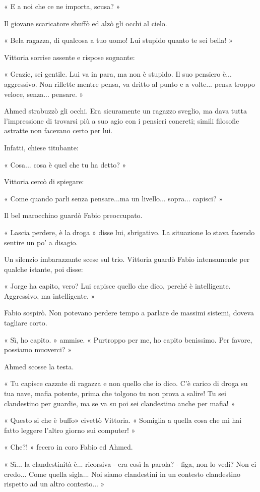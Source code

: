 « E a noi che ce ne importa, scusa? »

Il giovane scaricatore sbuffò ed alzò gli occhi al cielo.

« Bela ragazza, di qualcosa a tuo uomo! Lui stupido quanto te sei bella! »

Vittoria sorrise assente e rispose sognante:

« Grazie, sei gentile. Lui va in para, ma non è stupido. Il suo pensiero è... aggressivo. Non riflette mentre pensa, va dritto al punto e a volte... pensa troppo veloce, senza... pensare. »

Ahmed strabuzzò gli occhi. Era sicuramente un ragazzo sveglio, ma dava tutta l'impressione di trovarsi più a suo agio con i pensieri concreti; simili filosofie astratte non facevano certo per lui.

Infatti, chiese titubante:

« Cosa... cosa è quel che tu ha detto? »

Vittoria cercò di spiegare:

« Come quando parli senza pensare...ma un livello... sopra... capisci? »

Il bel marocchino guardò Fabio preoccupato.

« Lascia perdere, è la droga » disse lui, sbrigativo. La situazione lo stava facendo sentire un po' a disagio.

Un silenzio imbarazzante scese sul trio. Vittoria guardò Fabio intensamente per qualche istante, poi disse:

« Jorge ha capito, vero? Lui capisce quello che dico, perché è intelligente. Aggressivo, ma intelligente. »

Fabio sospirò. Non potevano perdere tempo a parlare de massimi sistemi, doveva tagliare corto.

« Sì, ho capito. » ammise. « Purtroppo per me, ho capito benissimo. Per favore, possiamo muoverci? »

Ahmed scosse la testa.

« Tu capisce cazzate di ragazza e non quello che io dico. C'è carico di droga su tua nave, mafia potente, prima che tolgono tu non prova a salire! Tu sei clandestino per guardie, ma se va su poi sei clandestino anche per mafia! »

« Questo si che è buffo» civettò Vittoria. « Somiglia a quella cosa che mi hai fatto leggere l'altro giorno sui computer! »

« Che?! » fecero in coro Fabio ed Ahmed.

« Sì... la clandestinità è... ricorsiva - era così la parola? - figa, non lo vedi? Non ci credo... Come quella sigla... Noi siamo clandestini in un contesto clandestino rispetto ad un altro contesto... »

